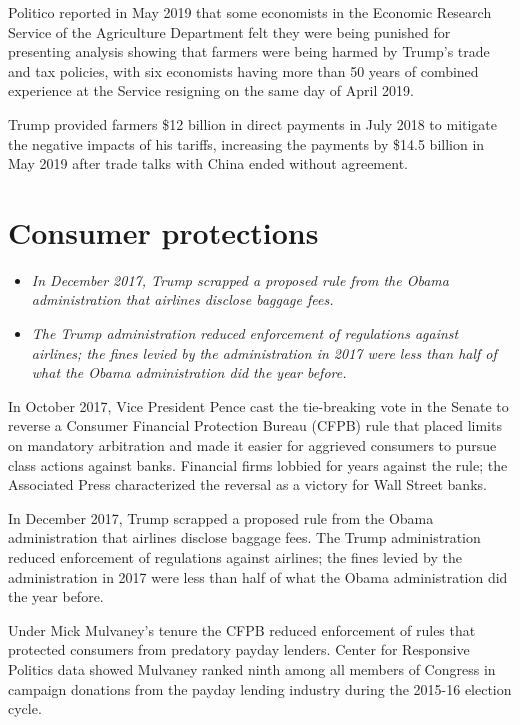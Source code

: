 Politico reported in May 2019 that some economists in the Economic
Research Service of the Agriculture Department felt they were being
punished for presenting analysis showing that farmers were being harmed
by Trump's trade and tax policies, with six economists having more than
50 years of combined experience at the Service resigning on the same day
of April 2019.

Trump provided farmers \$12 billion in direct payments in July 2018 to
mitigate the negative impacts of his tariffs, increasing the payments by
\$14.5 billion in May 2019 after trade talks with China ended without
agreement.

\section{Consumer protections}\label{consumer-protections}

\begin{itemize}
\item
  \emph{In December 2017, Trump scrapped a proposed rule from the Obama
  administration that airlines disclose baggage fees.}
\item
  \emph{The Trump administration reduced enforcement of regulations
  against airlines; the fines levied by the administration in 2017 were
  less than half of what the Obama administration did the year before.}
\end{itemize}

In October 2017, Vice President Pence cast the tie-breaking vote in the
Senate to reverse a Consumer Financial Protection Bureau (CFPB) rule
that placed limits on mandatory arbitration and made it easier for
aggrieved consumers to pursue class actions against banks. Financial
firms lobbied for years against the rule; the Associated Press
characterized the reversal as a victory for Wall Street banks.

In December 2017, Trump scrapped a proposed rule from the Obama
administration that airlines disclose baggage fees. The Trump
administration reduced enforcement of regulations against airlines; the
fines levied by the administration in 2017 were less than half of what
the Obama administration did the year before.

Under Mick Mulvaney's tenure the CFPB reduced enforcement of rules that
protected consumers from predatory payday lenders. Center for Responsive
Politics data showed Mulvaney ranked ninth among all members of Congress
in campaign donations from the payday lending industry during the
2015-16 election cycle.

